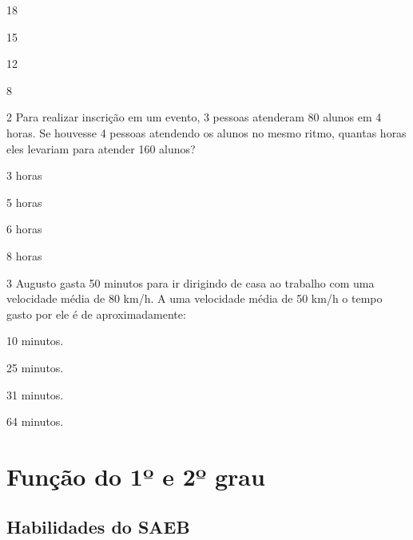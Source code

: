 \begin{escolha}

  \item 18

  \item 15

  \item 12

  \item 8

\end{escolha}

\num{2} Para realizar inscrição em um evento, 3 pessoas atenderam 80 alunos
em 4 horas. Se houvesse 4 pessoas atendendo os alunos no mesmo ritmo, quantas
horas eles levariam para atender 160 alunos?

\begin{escolha}
  \item 3 horas

  \item 5 horas

  \item 6 horas

  \item 8 horas
\end{escolha}

\pagebreak
\num{3} Augusto gasta 50 minutos para ir dirigindo de casa ao trabalho com
uma velocidade média de 80 km/h. A uma velocidade média de 50 km/h o tempo
gasto por ele é de aproximadamente:

\begin{escolha}

  \item 10 minutos.

  \item 25 minutos.

  \item 31 minutos.

  \item 64 minutos.

\end{escolha}


\chapter{Função do 1º e 2º grau}

\section{Habilidades do SAEB}

